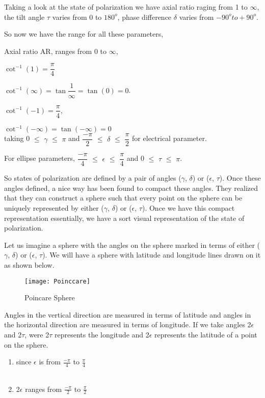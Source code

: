 	Taking a look at the state of polarization we have axial ratio raging from 1 to $\infty$, the tilt angle $\tau$ varies from 0 to $180^{o}$, phase difference $\delta$ varies from $-90^{o} to +90^{o}$.
	
	So now we have the range for all these parameters,
	
	Axial ratio AR, ranges from 0 to $\infty$, 
	
	$\cot^{-1}(1)= \dfrac{\pi}{4}$
	
	$\cot^{-1}(\infty)= \tan \dfrac{1}{\infty}= \tan(0)= 0$.
	
	$\cot^{-1}(-1) = \dfrac{\pi}{4}$, 
	
	$\cot^{-1}(-\infty) = \tan(-\infty) = 0$\\
	
	taking  0 $\leq$ $\gamma$ $\leq$ $\pi$  and $\dfrac{-\pi}{2}$ $\leq$ $\delta$ $\leq$ $\dfrac{\pi}{2}$ for electrical parameter.
	
	For ellipse parameters, $\dfrac{-\pi}{4}$ $\leq$ $\epsilon$ $\leq$ $\dfrac{\pi}{4}$ and 0 $\leq$ $\tau$ $\leq$ $\pi$.
	
	So states of polarization are defined by a pair of angles ($\gamma$, $\delta$) or ($\epsilon$, $\tau$). Once these angles defined, a nice way has been found to compact these angles. They realized that they can construct a sphere such that every point on the sphere can be uniquely represented by either ($\gamma$, $\delta$) or ($\epsilon$, $\tau$). Once we have this compact representation essentially, we have a sort visual representation of the state of polarization. 
	
	Let us imagine a sphere with the angles on the sphere marked in terms of either ($\gamma$, $\delta$) or ($\epsilon$, $\tau$). We will have a sphere with latitude and longitude lines drawn on it as shown below.\\
	\begin{figure}
		\centering
		\texttt{[image: Poinccare]}
		\caption{Poincare Sphere}
		\label{fig:poinccare}
	\end{figure}
		

	Angles in the vertical direction are measured in terms of latitude and angles in the horizontal direction are measured in terms of longitude. If we take angles 2$\epsilon$ and 2$\tau$, were 2$\tau$ represents the longitude and 2$\epsilon$ represents the latitude of a point on the sphere.
	
	\begin{enumerate}
	\item	since $\epsilon$ is from $\frac{-\pi}{4}$ to $\frac{\pi}{4}$
		\\\\
	\item 	2$\epsilon$ ranges from $\frac{-\pi}{2}$ to $\frac{\pi}{2}$
	\end{enumerate}
	
